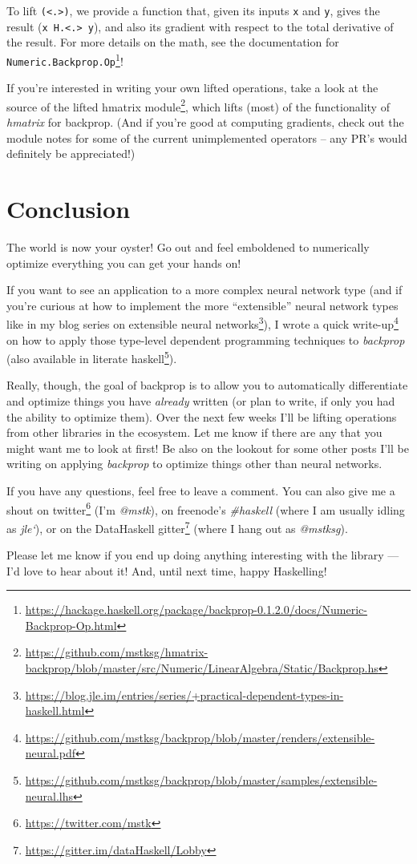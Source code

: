 \documentclass[]{article}
\renewcommand{\href}[2]{#2\footnote{\url{#1}}}
\begin{document}
To lift \texttt{(\textless{}.\textgreater{})}, we provide a function that, given
its inputs \texttt{x} and \texttt{y}, gives the result
(\texttt{x\ H.\textless{}.\textgreater{}\ y}), and also its gradient with
respect to the total derivative of the result. For more details on the math, see
the
\href{https://hackage.haskell.org/package/backprop-0.1.2.0/docs/Numeric-Backprop-Op.html}{documentation
for \texttt{Numeric.Backprop.Op}}!

If you're interested in writing your own lifted operations, take a look at the
\href{https://github.com/mstksg/hmatrix-backprop/blob/master/src/Numeric/LinearAlgebra/Static/Backprop.hs}{source
of the lifted hmatrix module}, which lifts (most) of the functionality of
\emph{hmatrix} for backprop. (And if you're good at computing gradients, check
out the module notes for some of the current unimplemented operators -- any PR's
would definitely be appreciated!)

\hypertarget{conclusion}{%
\section{Conclusion}\label{conclusion}}

The world is now your oyster! Go out and feel emboldened to numerically optimize
everything you can get your hands on!

If you want to see an application to a more complex neural network type (and if
you're curious at how to implement the more ``extensible'' neural network types
like in my
\href{https://blog.jle.im/entries/series/+practical-dependent-types-in-haskell.html}{blog
series on extensible neural networks}), I wrote
\href{https://github.com/mstksg/backprop/blob/master/renders/extensible-neural.pdf}{a
quick write-up} on how to apply those type-level dependent programming
techniques to \emph{backprop} (also available in
\href{https://github.com/mstksg/backprop/blob/master/samples/extensible-neural.lhs}{literate
haskell}).

Really, though, the goal of backprop is to allow you to automatically
differentiate and optimize things you have \emph{already} written (or plan to
write, if only you had the ability to optimize them). Over the next few weeks
I'll be lifting operations from other libraries in the ecosystem. Let me know if
there are any that you might want me to look at first! Be also on the lookout
for some other posts I'll be writing on applying \emph{backprop} to optimize
things other than neural networks.

If you have any questions, feel free to leave a comment. You can also give me a
shout on \href{https://twitter.com/mstk}{twitter} (I'm \emph{@mstk}), on
freenode's \emph{\#haskell} (where I am usually idling as \emph{jle`}), or on
the \href{https://gitter.im/dataHaskell/Lobby}{DataHaskell gitter} (where I hang
out as \emph{@mstksg}).

Please let me know if you end up doing anything interesting with the library ---
I'd love to hear about it! And, until next time, happy Haskelling!
\end{document}

